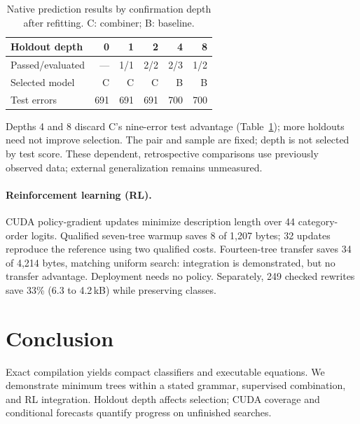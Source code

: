 \begin{table}[h]
\caption{Native prediction results by confirmation depth after refitting. C: combiner; B: baseline.}
\label{tab:holdout}
\centering\small
\setlength{\tabcolsep}{3pt}
\begin{tabular}{@{}lrrrrr@{}}
\toprule
Holdout depth & 0 & 1 & 2 & 4 & 8\\
\midrule
Passed/evaluated & --- & 1/1 & 2/2 & 2/3 & 1/2\\
Selected model & C & C & C & B & B\\
Test errors & 691 & 691 & 691 & 700 & 700\\
\bottomrule
\end{tabular}
\end{table}
Depths 4 and 8 discard C's nine-error test advantage (Table~\ref{tab:holdout}); more holdouts need not improve selection. The pair and sample are fixed; depth is not selected by test score. These dependent, retrospective comparisons use previously observed data; external generalization remains unmeasured.

\paragraph{Reinforcement learning (RL).}
CUDA policy-gradient updates \citep{williams1992} minimize description length \citep{rissanen1978} over 44 category-order logits. Qualified seven-tree warmup saves 8 of 1,207 bytes; 32 updates reproduce the reference using two qualified costs. Fourteen-tree transfer saves 34 of 4,214 bytes, matching uniform search: integration is demonstrated, but no transfer advantage. Deployment needs no policy. Separately, 249 checked rewrites save 33\% (6.3 to 4.2\,kB) while preserving classes.

\section{Conclusion}
Exact compilation yields compact classifiers and executable equations. We demonstrate minimum trees within a stated grammar, supervised combination, and RL integration. Holdout depth affects selection; CUDA coverage and conditional forecasts quantify progress on unfinished searches.

